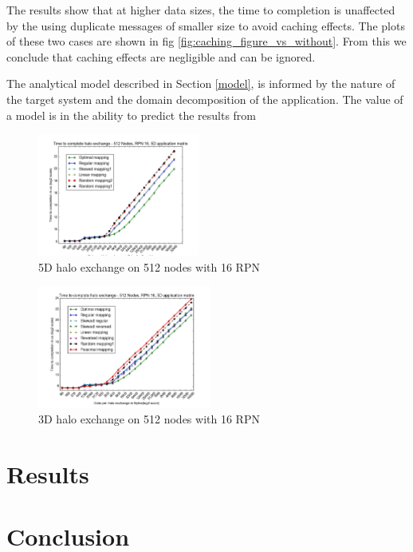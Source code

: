 \documentclass{acm_proc_article-sp}
\begin{document}
The results show that at higher data sizes, the time to completion is unaffected by the using duplicate messages of smaller size to avoid caching effects.
The plots of these two cases are shown in fig \ref{fig:caching_figure_vs_without}. From this we conclude that caching effects are negligible and can be ignored.



The analytical model described in Section \ref{model}, is informed by the nature of the target system
and the domain decomposition of the application. The value of a model is in the ability to predict the
results from
%

\begin{figure}
  \center
  \includegraphics[width=0.475\textwidth]{5D_512_most_mappings_2.png}
  \caption{5D halo exchange on 512 nodes with 16 RPN}
    \label{fig:5D halo exchange on 512 nodes with 16 RPN}
\end{figure}


\begin{figure}
  \center
  \includegraphics[width=0.51\textwidth]{3D_512_all_mappings.png}
  \caption{3D halo exchange on 512 nodes with 16 RPN}
    \label{fig:3D halo exchange on 512 nodes with 16 RPN}
\end{figure}




\section{Results}

\section{Conclusion}




\end{document}
